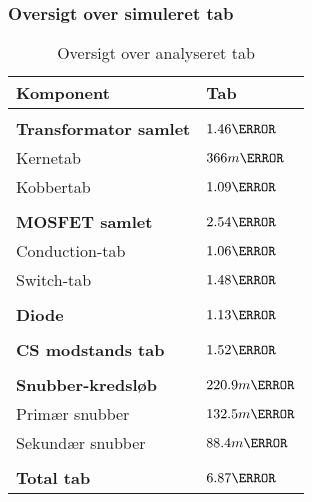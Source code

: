 \subsubsection{Oversigt over simuleret tab}
\begin{table}[H] 			
	\centering
	\begin{tabularx}{\textwidth}{|X|l|}
		\hline
		\textbf{\large Komponent} & \textbf{\large Tab} \\ \hline
		&  	\\ \hline
		\textbf{Transformator samlet} & $1.46\watt$  	\\ \hline 
		Kernetab & $366m\watt$  						\\ \hline
		Kobbertab & $1.09\watt$  						\\ \hline
		& 	\\ \hline
		\textbf{MOSFET samlet} & $2.54\watt$  			\\ \hline
		Conduction-tab & $1.06\watt$  					\\ \hline
		Switch-tab & $1.48\watt$  						\\ \hline
		& 	\\ \hline
		\textbf{Diode} & $1.13\watt$  					\\ \hline
		& 	\\ \hline
		\textbf{CS modstands tab} & $1.52\watt$  		\\ \hline
		& 	\\ \hline
		\textbf{Snubber-kredsløb} & $220.9m\watt$  		\\ \hline
		Primær snubber	& $132.5m\watt$					\\ \hline
		Sekundær snubber &	$88.4m\watt$ 				\\ \hline
		& 	\\ \hline
		\textbf{Total tab} & $6.87\watt$ 		 		\\ \hline
	\end{tabularx}
	\caption{Oversigt over analyseret tab}
	\label{tab:analyse_tab_3}
\end{table}
 